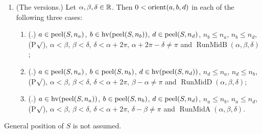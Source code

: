 \begin{theorem}
\begin{enumerate}[label=(\alph*)]
  $\alpha<\beta$, $\beta<\delta$, $\delta<\alpha+2\pi$, $\delta-\beta\neq\pi$ and
  $\operatorname{RunMidA}(\alpha,\beta,\delta)$, then $0<\orient(a,b,d)$.
\item \textup{(The  versions.)} Let $\alpha,\beta,\delta\in\mathbb R$. Then $0<\orient(a,b,d)$ in each
  of the following three cases:
  \begin{enumerate}[label=(e\arabic*)]
  \item \textup{(.)}
    $a\in\operatorname{peel}(S,n_a)$, $b\in\operatorname{hv}(\operatorname{peel}(S,n_b))$,
    $d\in\operatorname{peel}(S,n_d)$, $n_b\le n_a$, $n_b\le n_d$, \textup{(P$\surd$)}, $\alpha<\beta$, $\beta<\delta$,
    $\delta<\alpha+2\pi$, $\alpha+2\pi-\delta\neq\pi$ and $\operatorname{RunMidB}(\alpha,\beta,\delta)$;
  \item \textup{(.)}
    $a\in\operatorname{peel}(S,n_a)$, $b\in\operatorname{peel}(S,n_b)$,
    $d\in\operatorname{hv}(\operatorname{peel}(S,n_d))$, $n_d\le n_a$, $n_d\le n_b$, \textup{(P$\surd$)}, $\alpha<\beta$, $\beta<\delta$,
    $\delta<\alpha+2\pi$, $\beta-\alpha\neq\pi$ and $\operatorname{RunMidD}(\alpha,\beta,\delta)$;
  \item \textup{(.)}
    $a\in\operatorname{hv}(\operatorname{peel}(S,n_a))$, $b\in\operatorname{peel}(S,n_b)$,
    $d\in\operatorname{peel}(S,n_d)$, $n_a\le n_b$, $n_a\le n_d$, \textup{(P$\surd$)}, $\alpha<\beta$, $\beta<\delta$,
    $\delta<\alpha+2\pi$, $\delta-\beta\neq\pi$ and $\operatorname{RunMidA}(\alpha,\beta,\delta)$.
  \end{enumerate}
\end{enumerate}
General position of $S$ is not assumed.
\end{theorem}

